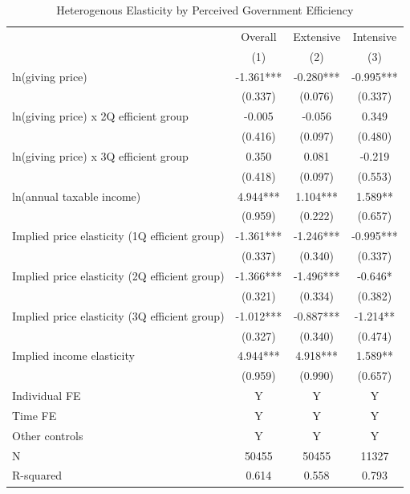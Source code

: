 \documentclass[
  11pt,
  a4paper,
]{article}
\begin{document}
  \begin{table}

  \caption{\label{tab:kableHeteroElasticity}Heterogenous Elasticity by Perceived Government Efficiency}
  \centering
  \fontsize{8}{10}\selectfont
  \begin{threeparttable}
  \begin{tabular}[t]{lccc}
  \toprule
  \multicolumn{1}{c}{ } & \multicolumn{1}{c}{Overall} & \multicolumn{1}{c}{Extensive} & \multicolumn{1}{c}{Intensive} \\
  \cmidrule(l{3pt}r{3pt}){2-2} \cmidrule(l{3pt}r{3pt}){3-3} \cmidrule(l{3pt}r{3pt}){4-4}
   & (1) & (2) & (3)\\
  \midrule
  ln(giving price) & -1.361*** & -0.280*** & -0.995***\\
   & (0.337) & (0.076) & (0.337)\\
  ln(giving price) x 2Q efficient group & -0.005 & -0.056 & 0.349\\
   & (0.416) & (0.097) & (0.480)\\
  ln(giving price) x 3Q efficient group & 0.350 & 0.081 & -0.219\\
   & (0.418) & (0.097) & (0.553)\\
  ln(annual taxable income) & 4.944*** & 1.104*** & 1.589**\\
   & (0.959) & (0.222) & (0.657)\\
  Implied price elasticity (1Q efficient group) & -1.361*** & -1.246*** & -0.995***\\
   & (0.337) & (0.340) & (0.337)\\
  Implied price elasticity (2Q efficient group) & -1.366*** & -1.496*** & -0.646*\\
   & (0.321) & (0.334) & (0.382)\\
  Implied price elasticity (3Q efficient group) & -1.012*** & -0.887*** & -1.214**\\
   & (0.327) & (0.340) & (0.474)\\
  Implied income elasticity & 4.944*** & 4.918*** & 1.589**\\
   & (0.959) & (0.990) & (0.657)\\
  Individual FE & Y & Y & Y\\
  Time FE & Y & Y & Y\\
  Other controls & Y & Y & Y\\
  N & 50455 & 50455 & 11327\\
  R-squared & 0.614 & 0.558 & 0.793\\
  \bottomrule
  \end{tabular}

\end{threeparttable}
\end{table}
\end{document}
